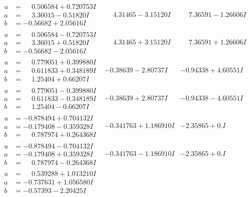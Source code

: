 \documentclass[1p]{elsarticle_modified}
\theoremstyle{definition}
\begin{document}
$$\begin{array}{c|c|c}
\begin{aligned}
u &= \phantom{-}0.506584 + 0.720753 I \\
a &= \phantom{-}3.36015 - 0.51820 I \\
b &= -0.56682 + 2.05616 I\end{aligned}
 & \phantom{-}4.31465 - 3.15120 I & \phantom{-}7.36591 - 1.26606 I \\ \hline\begin{aligned}
u &= \phantom{-}0.506584 - 0.720753 I \\
a &= \phantom{-}3.36015 + 0.51820 I \\
b &= -0.56682 - 2.05616 I\end{aligned}
 & \phantom{-}4.31465 + 3.15120 I & \phantom{-}7.36591 + 1.26606 I \\ \hline\begin{aligned}
u &= \phantom{-}0.779051 + 0.399880 I \\
a &= \phantom{-}0.611833 + 0.348189 I \\
b &= \phantom{-}1.25404 + 0.66207 I\end{aligned}
 & -0.38639 - 2.80737 I & -0.94338 + 4.60551 I \\ \hline\begin{aligned}
u &= \phantom{-}0.779051 - 0.399880 I \\
a &= \phantom{-}0.611833 - 0.348189 I \\
b &= \phantom{-}1.25404 - 0.66207 I\end{aligned}
 & -0.38639 + 2.80737 I & -0.94338 - 4.60551 I \\ \hline\begin{aligned}
u &= -0.878494 + 0.704132 I \\
a &= -0.179408 - 0.359328 I \\
b &= \phantom{-}0.787974 + 0.264368 I\end{aligned}
 & -0.341763 + 1.186910 I & -2.35865 + 0. I\phantom{ +0.000000I} \\ \hline\begin{aligned}
u &= -0.878494 - 0.704132 I \\
a &= -0.179408 + 0.359328 I \\
b &= \phantom{-}0.787974 - 0.264368 I\end{aligned}
 & -0.341763 - 1.186910 I & -2.35865 + 0. I\phantom{ +0.000000I} \\ \hline\begin{aligned}
u &= \phantom{-}0.539288 + 1.013210 I \\
a &= -0.737631 + 1.056580 I \\
b &= -0.57393 - 2.20425 I\end{aligned}

\end{array}$$
\end{document}
